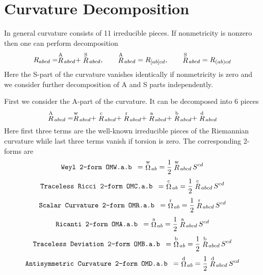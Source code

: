 \documentclass[twoside,openright]{report}
\newcommand{\grgtt}{\ttfamily}
\newcommand{\object}[2]{%
\begin{equation}
\mbox{\comm{#1}} =\ #2
\end{equation}}
\newcommand{\RR}[1]{\stackrel{\rm #1}{R}\!{}}
\newcommand{\OO}[1]{\stackrel{\rm #1}{\Omega}\!{}}
\renewcommand{\tt}{\grgtt}
\newcommand{\comm}[1]{{\upshape\tt#1}}    %
\begin{document}
\section{Curvature Decomposition}

In general curvature consists of 11 irreducible pieces.
If nonmetricity is nonzero then one can
perform decomposition
\begin{equation}
R_{abcd}=\RR{A}_{abcd}+\RR{S}_{abcd},\qquad
\RR{A}_{abcd}=R_{[ab]cd},\qquad
\RR{S}_{abcd}=R_{(ab)cd}
\end{equation}
Here the S-part of the curvature vanishes identically if
nonmetricity is zero and we consider further decomposition
of A and S parts independently.

First we consider the A-part of the curvature. It can be
decomposed into 6 pieces
\begin{equation}
\RR{A}_{abcd} =
\RR{w}_{abcd}+
\RR{c}_{abcd}+
\RR{r}_{abcd}+
\RR{a}_{abcd}+
\RR{b}_{abcd}+
\RR{d}_{abcd}
\end{equation}
Here first three terms are the well-known irreducible pieces
of the Riemannian curvature while last three terms vanish if
torsion is zero. The corresponding 2-forms are
\object{Weyl 2-form                        OMW.a.b }
{\OO{w}_{ab} = \frac12 \RR{w}_{abcd}\,S^{cd}}
\object{Traceless Ricci 2-form             OMC.a.b }
{\OO{c}_{ab} = \frac12 \RR{c}_{abcd}\,S^{cd}}
\object{Scalar Curvature 2-form            OMR.a.b }
{\OO{r}_{ab} = \frac12 \RR{r}_{abcd}\,S^{cd}}
\object{Ricanti 2-form                     OMA.a.b }
{\OO{a}_{ab} = \frac12 \RR{a}_{abcd}\,S^{cd}}
\object{Traceless Deviation 2-form         OMB.a.b }
{\OO{b}_{ab} = \frac12 \RR{b}_{abcd}\,S^{cd}}
\object{Antisymmetric Curvature 2-form     OMD.a.b }
{\OO{d}_{ab} = \frac12 \RR{d}_{abcd}\,S^{cd}}
\end{document}
